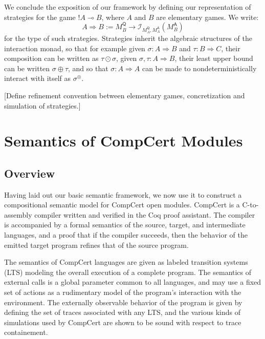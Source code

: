 \documentclass[acmsmall,timestamp,review,anonymous]{acmart}
\newcommand{\kw}[1]{\ensuremath{ \mathsf{#1} }}
\begin{document}
We conclude the exposition of our framework
by defining our representation
of strategies for the game $!A \multimap B$,
where $A$ and $B$ are elementary games.
We write:
\[ A \Rightarrow B := M_B^\kw{Q} \rightarrow
   \mathcal{I}_{M_A^\kw{Q},M_A^\kw{A}}(M_B^\kw{A}) \]
for the type of such strategies.
Strategies inherit the algebraic structures
of the interaction monad,
so that for example
given $\sigma : A \Rightarrow B$ and $\tau : B \Rightarrow C$,
their composition can be written as $\tau \odot \sigma$,
given $\sigma, \tau : A \Rightarrow B$,
their least upper bound
can be written $\sigma \oplus \tau$,
and so that $\sigma : A \Rightarrow A$
can be made to nondeterministically interact with itself
as $\sigma^\circledcirc$.

[Define refinement convention between elementary games,
concretization and simulation of strategies.]



\section{Semantics of CompCert Modules} \label{sec:modsem} %

\subsection{Overview} %

Having laid out our basic semantic framework,
we now use it to construct a compositional semantic model
for CompCert open modules.
CompCert is a C-to-assembly compiler written and verified
in the Coq proof assistant.
The compiler is accompanied by
a formal semantics of the source, target, and intermediate languages,
and a proof that if the compiler succeeds,
then the behavior of the emitted target program
refines that of the source program.

The semantics of CompCert languages
are given as labeled transition systems (LTS)
modeling the overall execution of a complete program.
The semantics of external calls
is a global parameter common to all languages,
and may use a fixed set of actions as a rudimentary model
of the program's interaction with the environment.
The externally observable behavior of the program
is given by defining the set of traces associated with any LTS,
and the various kinds of simulations used by CompCert
are shown to be sound with respect to trace containement.
\end{document}
